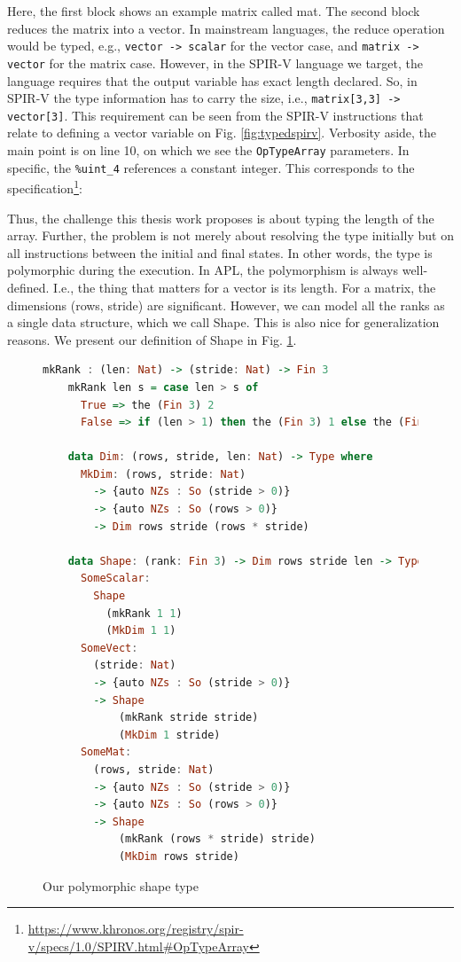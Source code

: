 \documentclass{report}
\begin{document}
Here, the first block shows an example matrix called mat. The second block reduces the matrix into a vector. In mainstream languages, the reduce operation would be typed, e.g., \verb|vector -> scalar| for the vector case, and \verb|matrix -> vector| for the matrix case. However, in the SPIR-V language we target, the language requires that the output variable has exact length declared. So, in SPIR-V the type information has to carry the size, i.e., \verb|matrix[3,3] -> vector[3]|. This requirement can be seen from the SPIR-V instructions that relate to defining a vector variable on Fig. \ref{fig:typedspirv}. Verbosity aside, the main point is on line 10, on which we see the \verb|OpTypeArray| parameters. In specific, the \verb|%uint_4| references a constant integer. This corresponds to the specification\footnote{ \url{https://www.khronos.org/registry/spir-v/specs/1.0/SPIRV.html#OpTypeArray}}: 

Thus, the challenge this thesis work proposes is about typing the length of the array. Further, the problem is not merely about resolving the type initially but on all instructions between the initial and final states. In other words, the type is polymorphic during the execution. In APL, the polymorphism is always well-defined. I.e., the thing that matters for a vector is its length. For a matrix, the dimensions (rows, stride) are significant. However, we can model all the ranks as a single data structure, which we call Shape. This is also nice for generalization reasons. We present our definition of Shape in Fig. \ref{fig:shape}.

\begin{figure}
\begin{lstlisting}[language=Haskell]
    mkRank : (len: Nat) -> (stride: Nat) -> Fin 3
    mkRank len s = case len > s of
      True => the (Fin 3) 2
      False => if (len > 1) then the (Fin 3) 1 else the (Fin 3) 0

    data Dim: (rows, stride, len: Nat) -> Type where
      MkDim: (rows, stride: Nat)
        -> {auto NZs : So (stride > 0)}
        -> {auto NZs : So (rows > 0)}
        -> Dim rows stride (rows * stride)

    data Shape: (rank: Fin 3) -> Dim rows stride len -> Type where
      SomeScalar:
        Shape
          (mkRank 1 1)
          (MkDim 1 1)
      SomeVect:
        (stride: Nat)
        -> {auto NZs : So (stride > 0)}
        -> Shape
            (mkRank stride stride)
            (MkDim 1 stride)
      SomeMat:
        (rows, stride: Nat)
        -> {auto NZs : So (stride > 0)}
        -> {auto NZs : So (rows > 0)}
        -> Shape
            (mkRank (rows * stride) stride)
            (MkDim rows stride)
\end{lstlisting}
\caption{Our polymorphic shape type}
\label{fig:shape}
\end{figure}
\end{document}
